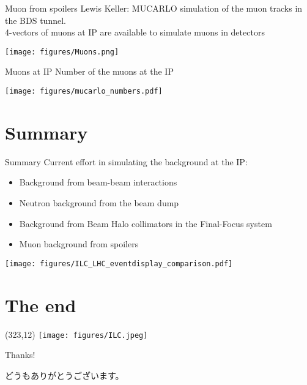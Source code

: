 \documentclass[xcolor={dvipsnames}]{beamer}
\newcommand{\ilclogo}{
  \setlength{\TPHorizModule}{1pt}
  \setlength{\TPVertModule}{1pt}
  \begin{textblock}{1}(323,12)
   \texttt{[image: figures/ILC.jpeg]}
  \end{textblock}
}
\begin{document}
\begin{frame}{Muon from spoilers}
 Lewis Keller: MUCARLO simulation of the muon tracks in the BDS tunnel.\\
 4-vectors of muons at IP are available to simulate muons in detectors
 \begin{center}
 	\texttt{[image: figures/Muons.png]}
  \end{center}
\end{frame}

\begin{frame}{Muons at IP}
Number of the muons at the IP
  \begin{center}
 	\texttt{[image: figures/mucarlo\_numbers.pdf]}
  \end{center}
\end{frame}

\section*{Summary}
\begin{frame}{Summary}
Current effort in simulating the background at the IP:
 \begin{itemize}
  \item Background from beam-beam interactions
  \item Neutron background from the beam dump
  \item Background from Beam Halo collimators in the Final-Focus system
  \item Muon background from spoilers
 \end{itemize}
 
 \vspace*{0.5cm}
 
 \begin{center}
  \texttt{[image: figures/ILC\_LHC\_eventdisplay\_comparison.pdf]}
 \end{center}


\end{frame}




\section*{The end}
{
\begin{frame}
\ilclogo
\begin{center}
\textcolor{RubineRed}{
	\LARGE Thanks!\\
	\vspace*{0.5cm}
	\begin{CJK}{UTF8}{min}
	どうもありがとうございます。
	\end{CJK}
}
\end{center}
\end{frame}
}
\end{document}
